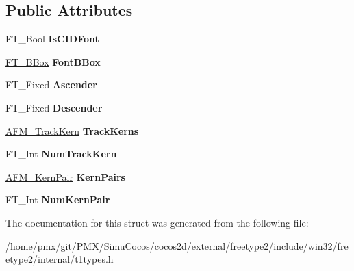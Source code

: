 \subsection*{Public Attributes}
\begin{DoxyCompactItemize}
\item 
\mbox{\label{structAFM__FontInfoRec___a6f198e74da5d8a3b7ff7518e255be231}} 
F\+T\+\_\+\+Bool {\bfseries Is\+C\+I\+D\+Font}
\item 
\mbox{\label{structAFM__FontInfoRec___afa5112d6b0cc51839889206012dc1be6}} 
\hyperlink{structFT__BBox__}{F\+T\+\_\+\+B\+Box} {\bfseries Font\+B\+Box}
\item 
\mbox{\label{structAFM__FontInfoRec___a0b80412562435a2198a71aa4188ee85b}} 
F\+T\+\_\+\+Fixed {\bfseries Ascender}
\item 
\mbox{\label{structAFM__FontInfoRec___a3561507200f0bc3413988af920924053}} 
F\+T\+\_\+\+Fixed {\bfseries Descender}
\item 
\mbox{\label{structAFM__FontInfoRec___a8d9305229a1dacc15b8fceb5dbf25b9d}} 
\hyperlink{structAFM__TrackKernRec__}{A\+F\+M\+\_\+\+Track\+Kern} {\bfseries Track\+Kerns}
\item 
\mbox{\label{structAFM__FontInfoRec___a08a9207e8d4b0dd9dc0313218462f00e}} 
F\+T\+\_\+\+Int {\bfseries Num\+Track\+Kern}
\item 
\mbox{\label{structAFM__FontInfoRec___a16c5da5249d4d4f68cc169469f3ee75a}} 
\hyperlink{structAFM__KernPairRec__}{A\+F\+M\+\_\+\+Kern\+Pair} {\bfseries Kern\+Pairs}
\item 
\mbox{\label{structAFM__FontInfoRec___a8ff8af3c83fbf0b060bb711b57f1affd}} 
F\+T\+\_\+\+Int {\bfseries Num\+Kern\+Pair}
\end{DoxyCompactItemize}


The documentation for this struct was generated from the following file\+:\begin{DoxyCompactItemize}
\item 
/home/pmx/git/\+P\+M\+X/\+Simu\+Cocos/cocos2d/external/freetype2/include/win32/freetype2/internal/t1types.\+h\end{DoxyCompactItemize}
